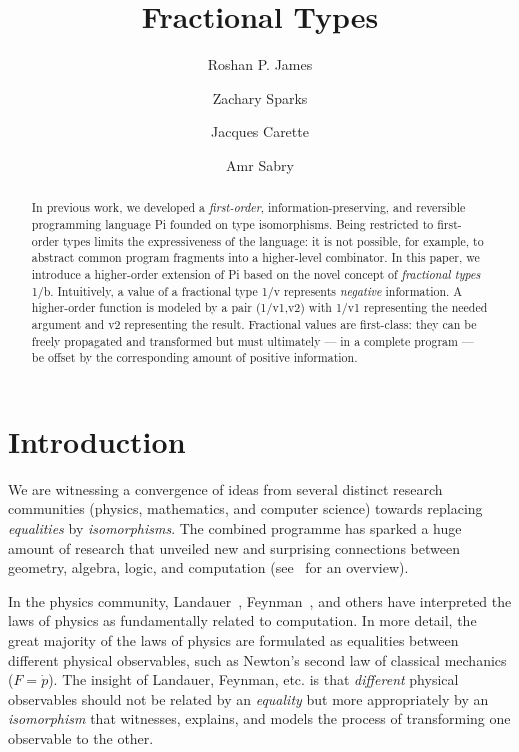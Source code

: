 \documentclass{llncs}
\begin{document}
\title{Fractional Types}
\author{Roshan P. James \and Zachary Sparks \and Jacques Carette \and Amr Sabry}
\maketitle

\begin{abstract}
  In previous work, we developed a \emph{first-order},
  information-preserving, and reversible programming language {{Pi}} founded
  on type isomorphisms. Being restricted to first-order types limits the
  expressiveness of the language: it is not possible, for example, to
  abstract common program fragments into a higher-level combinator. In this
  paper, we introduce a higher-order extension of {{Pi}} based on the novel
  concept of \emph{fractional types} {{1/b}}. Intuitively, a value of a
  fractional type {{1/v}} represents \emph{negative} information. A
  higher-order function is modeled by a pair {{(1/v1,v2)}} with {{1/v1}}
  representing the needed argument and {{v2}} representing the
  result. Fractional values are first-class: they can be freely propagated
  and transformed but must ultimately --- in a complete program --- be offset
  by the corresponding amount of positive information.
\end{abstract}

\section{Introduction} 

We are witnessing a convergence of ideas from several distinct research
communities (physics, mathematics, and computer science) towards replacing
\emph{equalities} by \emph{isomorphisms}. The combined programme 
has sparked a huge amount of research that unveiled
new and surprising connections between geometry, algebra, logic, and
computation (see~\cite{baez2011physics} for an overview).

In the physics community, Landauer~\cite{Landauer:1961,Landauer},
Feynman~\cite{springerlink:10.1007/BF02650179}, and others have interpreted
the laws of physics as fundamentally related to computation. In more detail,
the great majority of the laws of physics are formulated as equalities
between different physical observables, such as Newton's second law of
classical mechanics ($F=\dot{p}$).
The insight of Landauer, Feynman, etc. is that
\emph{different} physical observables should not be related by an
\emph{equality} but more appropriately by an \emph{isomorphism} that
witnesses, explains, and models the process of transforming one observable to
the other.
\end{document}
